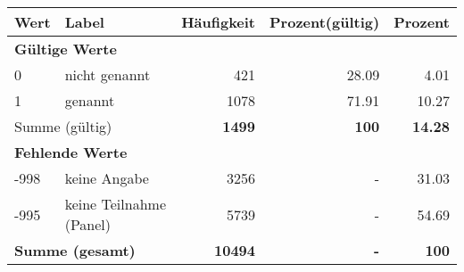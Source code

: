      \begin{longtable}{lXrrr}
     \toprule
     \textbf{Wert} & \textbf{Label} & \textbf{Häufigkeit} & \textbf{Prozent(gültig)} & \textbf{Prozent} \\
     \endhead
     \midrule
     \multicolumn{5}{l}{\textbf{Gültige Werte}}\\

     0 &
     \multicolumn{1}{X}{ nicht genannt   } &


       \num{421} &
       \num[round-mode=places,round-precision=2]{28,09} &
         \num[round-mode=places,round-precision=2]{4,01} \\

     1 &
     \multicolumn{1}{X}{ genannt   } &


       \num{1078} &
       \num[round-mode=places,round-precision=2]{71,91} &
         \num[round-mode=places,round-precision=2]{10,27} \\
     \midrule
     \multicolumn{2}{l}{Summe (gültig)} &
       \textbf{\num{1499}} &
     \textbf{100} &
       \textbf{\num[round-mode=places,round-precision=2]{14,28}} \\
     \multicolumn{5}{l}{\textbf{Fehlende Werte}}\\
       -998 &
       keine Angabe &
         \num{3256} &
        - &
         \num[round-mode=places,round-precision=2]{31,03} \\
       -995 &
       keine Teilnahme (Panel) &
         \num{5739} &
        - &
         \num[round-mode=places,round-precision=2]{54,69} \\
     \midrule
     \multicolumn{2}{l}{\textbf{Summe (gesamt)}} &
          \textbf{\num{10494}} &
        \textbf{-} &
        \textbf{100} \\
     \bottomrule
     \end{longtable}
     
